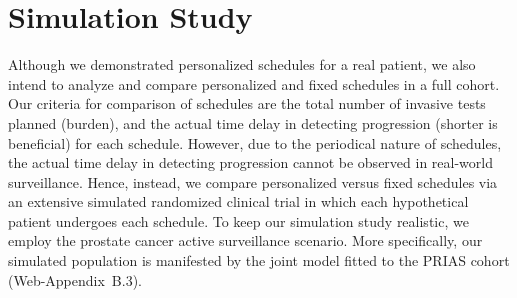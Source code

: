 \section{Simulation Study}
\label{sec:sim_study}
Although we demonstrated personalized schedules for a real patient, we also intend to analyze and compare personalized and fixed schedules in a full cohort. Our criteria for comparison of schedules are the total number of invasive tests planned (burden), and the actual time delay in detecting progression (shorter is beneficial) for each schedule. However, due to the periodical nature of schedules, the actual time delay in detecting progression cannot be observed in real-world surveillance. Hence, instead, we compare personalized versus fixed schedules via an extensive simulated randomized clinical trial in which each hypothetical patient undergoes each schedule. To keep our simulation study realistic, we employ the prostate cancer active surveillance scenario. More specifically, our simulated population is manifested by the joint model fitted to the PRIAS cohort (Web-Appendix~B.3).

